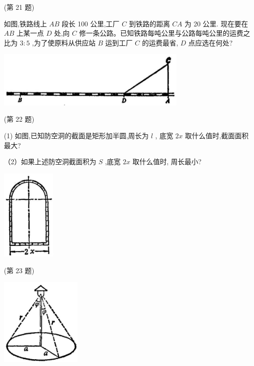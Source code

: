 \documentclass[lang=cn,newtx,10pt,scheme=chinese]{elegantbook}
\begin{document}
\begin{problemset}[习 题 十 一]
(第 21 题)

\item 如图,铁路线上 \({AB}\) 段长 100 公里,工厂 \(C\) 到铁路的距离 \({CA}\) 为 20 公里. 现在要在 \({AB}\) 上某一点 \(D\) 处,向 \(C\) 修一条公路。已知铁路每吨公里与公路每吨公里的运费之比为 \(3 : 5\) ,为了使原料从供应站 \(B\) 运到工厂 \(C\) 的运费最省, \(D\) 点应选在何处?

\begin{center}
\includegraphics[max width=0.7\textwidth]{images/01912c18-5c3f-733d-b775-749ba9897a9d_158_819415.jpg}
\end{center}

(第 22 题)

\item (1) 如图,已知防空洞的截面是矩形加半圆,周长为 \(l\) , 底宽 \({2x}\) 取什么值时,截面面积最大?

（2）如果上述防空洞截面积为 \(S\) ,底宽 \({2x}\) 取什么值时, 周长最小?

\begin{center}
\includegraphics[max width=0.2\textwidth]{images/01912c18-5c3f-733d-b775-749ba9897a9d_159_493137.jpg}
\end{center}

(第 23 题)

\begin{center}
\includegraphics[max width=0.3\textwidth]{images/01912c18-5c3f-733d-b775-749ba9897a9d_159_646060.jpg}
\end{center}


\end{problemset}
\end{document}
